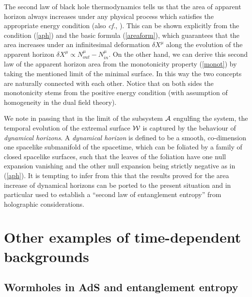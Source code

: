 \documentclass[12pt]{article}
\def\req#1{(\ref{#1})}
\def\cf{{\it cf.}}
\def\CA{{\cal A}}
\def\CW{{\cal W}}
\def\Gms{\CW}
\def\rA{\CA}
\begin{document}
The second law of black hole thermodynamics tells us that the area
of apparent horizon  always increases under any physical process
which satisfies the appropriate energy condition \cite{Hawking:1973uf} (also \cf,
\cite{Ashtekar:2004cn}). This can be shown explicitly from the
condition \req{aph} and the basic formula \req{areaform}, which
guarantees that the area increases under an infinitesimal
deformation $\delta X^\mu$ along the evolution of the apparent
horizon $\delta X^\mu\propto N_{out}^\mu-N_{in}^\mu$. On the other
hand, we can derive this second law of the apparent horizon area
from the monotonicity property \req{monot} by taking the mentioned
limit of the minimal surface. In this way the two concepts are
naturally connected with each other. Notice that on both sides the
monotonicity stems from the positive energy condition (with assumption of 
homogeneity in the dual field theory).

We note in passing that in the limit of the subsystem $\rA$ engulfing the system,
the temporal evolution of the extremal surface $\Gms$ is captured by the behaviour of {\em dynamical horizons}. A {\em dynamical horizon} is defined to be a smooth, co-dimension one spacelike submanifold of the spacetime, which can be foliated by a family of closed spacelike surfaces, such that the leaves of the foliation have one null expansion vanishing and the other null expansion being strictly negative \cite{Ashtekar:2003hk,Ashtekar:2004cn} as in \req{aph}. It is tempting to infer from this that the results proved for the area increase of dynamical horizons can be ported to the present situation and in particular used to establish a ``second law of entanglement entropy'' from holographic considerations.

\section{Other examples of time-dependent backgrounds}
\label{wholebub}

\subsection{Wormholes in AdS and entanglement entropy}
\end{document}
